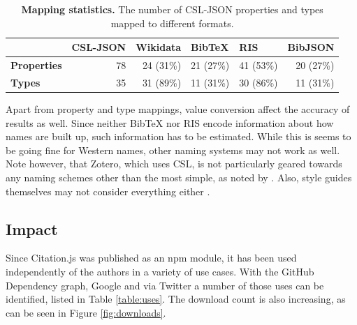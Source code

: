 \documentclass[fleqn,10pt,lineno]{wlpeerj} %
\begin{document}
\begin{table}[bt]
\caption{\textbf{Mapping statistics.} The number of CSL-JSON properties and types mapped to different formats. }
\label{table:completeness}
\begin{tabular}{l|r|r|r|r|r|}
\cline{2-6}
                                          & \multicolumn{1}{l|}{\textbf{CSL-JSON}} & \multicolumn{1}{l|}{\textbf{Wikidata}} & \multicolumn{1}{l|}{\textbf{BibTeX}} & \multicolumn{1}{l|}{\textbf{RIS}} & \multicolumn{1}{l|}{\textbf{BibJSON}} \\ \hline
\multicolumn{1}{|l|}{\textbf{Properties}} & 78                                     & 24 (31\%)                              & 21 (27\%)                            & 41 (53\%)                         & 20 (27\%)                             \\ \hline
\multicolumn{1}{|l|}{\textbf{Types}}      & 35                                     & 31 (89\%)                              & 11 (31\%)                            & 30 (86\%)                         & 11 (31\%)                             \\ \hline
\end{tabular}
\end{table}

Apart from property and type mappings, value conversion affect the accuracy of results as well. Since neither BibTeX nor RIS encode information about how names are built up, such information has to be estimated. While this is seems to be going fine for Western names, other naming systems may not work as well. Note however, that Zotero, which uses CSL, is not particularly geared towards any naming schemes other than the most simple, as noted by 
\cite{darcus_non-western_2008}. Also, style guides themselves may not consider everything either \citep{qiu_scientific_2008,puniamoorthy_give_2008}.

\subsection*{Impact}

Since Citation.js was published as an npm module, it has been used independently of the authors in a variety of use cases. With the GitHub Dependency graph, Google and via Twitter a number of those uses can be identified, listed in Table \ref{table:uses}. The download count is also increasing, as can be seen in Figure \ref{fig:downloads}.
\end{document}
